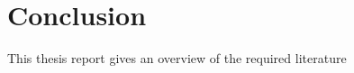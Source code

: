 \chapter{Conclusion}
\label{cha:conclusion}
This thesis report gives an overview of the required literature


